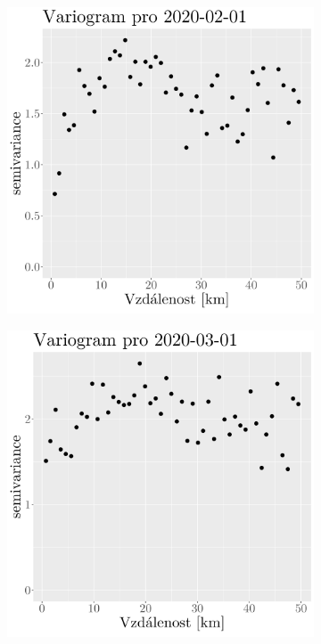 \begin{figure}
\begin{subfigure}{0.30\textwidth}
		\includegraphics[width=\textwidth]{img/ch2/variograms/variogram_max15cm2.png}
		\caption{}
		\label{fig:variogram2}
	\end{subfigure}
	\hfill
	\begin{subfigure}{0.30\textwidth}
		\includegraphics[width=\textwidth]{img/ch2/variograms/variogram_max15cm3.png}

\end{subfigure}
\end{figure}
